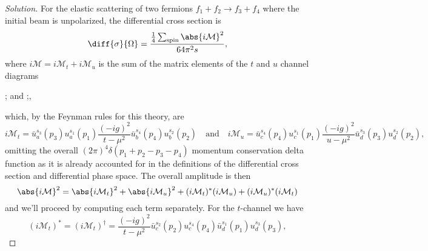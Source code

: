 \begin{proof}[Solution]
    For the elastic scattering of two fermions \(f_1 + f_2 \to f_3 + f_4\) where the initial beam is unpolarized, the differential cross section is
    \begin{equation*}
        \diff{\sigma}{\Omega} = \frac{\frac14\sum_{\mathrm{spin}}\abs{i\mathcal{M}}^2}{64 \pi^2 s},
    \end{equation*}
    where \(i\mathcal{M} = i\mathcal{M}_t + i \mathcal{M}_u\) is the sum of the matrix elements of the \(t\) and \(u\) channel diagrams
    \begin{center}
      ;
      \quad and \quad
      ;,
   \end{center}
   which, by the Feynman rules for this theory, are
   \begin{equation*}
       i\mathcal{M}_t = \bar{u}_a^{s_3}(p_3) u_a^{s_1}(p_1) \frac{(-i g)^2}{t - \mu^2} \bar{u}_b^{s_4}(p_4)u_b^{s_2}(p_2)
       \quad\text{and}\quad
       i\mathcal{M}_u = \bar{u}_c^{s_4}(p_4) u_c^{s_1}(p_1) \frac{(-i g)^2}{u - \mu^2} \bar{u}_d^{s_3}(p_3)u_d^{s_2}(p_2),
   \end{equation*}
   omitting the overall \((2\pi)^4 \delta(p_1 + p_2 - p_3 - p_4)\) momentum conservation delta function as it is already accounted for in the definitions of the differential cross section and differential phase space. The overall amplitude is then
   \begin{equation*}
       \abs{i\mathcal{M}}^2 = \abs{i\mathcal{M}_t}^2 + \abs{i \mathcal{M}_u}^2 + (i\mathcal{M}_t)^*(i\mathcal{M}_u) + (i\mathcal{M}_u)^*(i\mathcal{M}_t)
   \end{equation*}
   and we'll proceed by computing each term separately. For the \(t\)-channel we have
   \begin{equation*}
       (i \mathcal{M}_t)^* = (i \mathcal{M}_t)^\dag = \frac{(-ig)^2}{t - \mu^2}\bar{u}_c^{s_2}(p_2) u_c^{s_4}(p_4) \bar{u}_d^{s_1}(p_1) u_d^{s_3}(p_3),

\end{equation*}
\end{proof}
